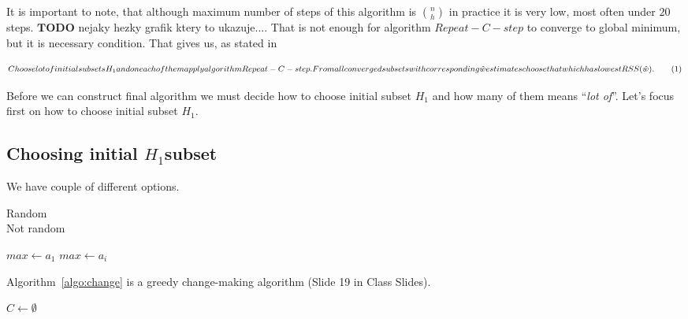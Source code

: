 It is important to note, that although maximum number of steps of this algorithm is ${n \choose h}$ in practice it is very low, most often under $20$ steps. $\boldsymbol{TODO}$ nejaky hezky grafik ktery to ukazuje....
That is not enough for algorithm $Repeat-C-step$ to converge to global minimum, but it is necessary condition. That gives us, as stated in \cite{rouss:2000}

\[ 
	Choose lot of initial subsets H_1 and on each of them apply algorithm Repeat-C-step. From all converged subsets with corresponding \hat{w} estimates choose that which has lowest RSS(\hat{w}). \numberthis
\]

Before we can construct final algorithm we must decide how to choose initial subset $H_1$ and how many of them means ``\emph{lot of}''. Let's focus first on how to choose initial subset $H_1$.

\subsection{Choosing initial $H_1$subset}

We have couple of different options.

\begin{description}
	\item[Random] 
	\item[Not random] 
\end{description}




\begin{algorithm}
	\DontPrintSemicolon %
	$max \gets a_1$\;
	 {
	   {
		$max \gets a_i$\;
	  }
	}
	\;
	\label{algo:max}
	\end{algorithm}
	
	Algorithm~\ref{algo:change} is a greedy change-making algorithm (Slide 19 in Class Slides).
	
	\begin{algorithm}
	\DontPrintSemicolon %
	$C \gets \emptyset$\;
	\;
	\label{algo:change}
	\end{algorithm}
	
